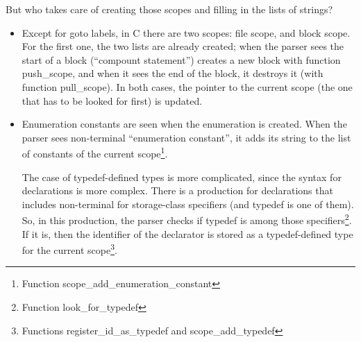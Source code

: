 \documentclass[a4paper,openany]{article}
\begin{document}
But who takes care of creating those scopes and filling in the lists of strings?

\begin{itemize}
\item Except for goto labels, in C there are two scopes: file scope, and block scope. For the first one, the two lists are already created; when the parser sees the start of a block (``compount statement'') creates a new block with function push\_scope, and when it sees the end of the block, it destroys it (with function pull\_scope). In both cases, the pointer to the current scope (the one that has to be looked for first) is updated.

\item Enumeration constants are seen when the enumeration is created. When the parser sees non-terminal ``enumeration constant'', it adds its string to the list of constants of the current scope\footnote{Function scope\_add\_enumeration\_constant}.

The case of typedef-defined types is more complicated, since the syntax for declarations is more complex. There is a production for declarations that includes non-terminal for storage-class specifiers (and typedef is one of them). So, in this production, the parser checks if typedef is among those specifiers\footnote{Function look\_for\_typedef}. If it is, then the identifier of the declarator is stored as a typedef-defined type for the current scope\footnote{Functions register\_id\_as\_typedef and scope\_add\_typedef}.
\end{itemize}
\end{document}
